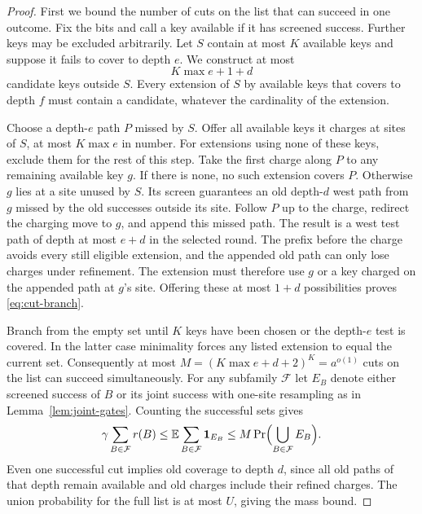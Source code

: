 \begin{proof}
First we bound the number of cuts on the list that can succeed in
one outcome. Fix the bits and call a key available if it has screened
success. Further keys may be excluded arbitrarily. Let \(S\) contain
at most \(K\) available keys and suppose it fails to cover to depth
\(e\). We construct at most
\begin{equation}\label{eq:cut-branch}
 K\max e+1+d
\end{equation}
candidate keys outside \(S\). Every extension of \(S\) by available
keys that covers to depth \(f\) must contain a candidate, whatever
the cardinality of the extension.

Choose a depth-$e$ path $P$ missed by $S$. Offer all available keys it
charges at sites of $S$, at most $K\max e$ in number. For extensions
using none of these keys, exclude them for the rest of this step. Take
the first charge along $P$ to any remaining available key $g$. If there
is none, no such extension covers $P$. Otherwise $g$ lies at a site
unused by $S$. Its screen guarantees an old depth-$d$ west path from
$g$ missed by the old successes outside its site. Follow $P$ up to the
charge, redirect the charging move to $g$, and append this missed path.
The result is a west test path of depth at most $e+d$ in the selected
round. The prefix before the charge avoids every still eligible extension,
and the appended old path can only lose charges under refinement.
The extension must therefore use $g$ or a key charged on the appended
path at $g$'s site. Offering these at most $1+d$ possibilities proves
\eqref{eq:cut-branch}.

Branch from the empty set until $K$ keys have been chosen or the
depth-$e$ test is covered. In the latter case minimality forces any
listed extension to equal the current set. Consequently
at most $M=(K\max e+d+2)^K=a^{o(1)}$ cuts on the list can succeed
simultaneously. For any subfamily $\mathcal F$ let $E_B$ denote either
screened success of $B$ or its joint success with one-site resampling
as in Lemma~\ref{lem:joint-gates}. Counting the successful sets gives
\begin{equation}\label{eq:cut-multiplicity}
 \gamma\sum_{B\in\mathcal F} r(B)
 \le \mathbb E\sum_{B\in\mathcal F}{\bf 1}_{E_B}
 \le M\Pr\Bigl(\bigcup_{B\in\mathcal F}E_B\Bigr).
\end{equation}
Even one successful cut implies old coverage to depth $d$, since all
old paths of that depth remain available and old charges include their
refined charges. The union probability for the full list is at most $U$,
giving the mass bound.


\end{proof}
